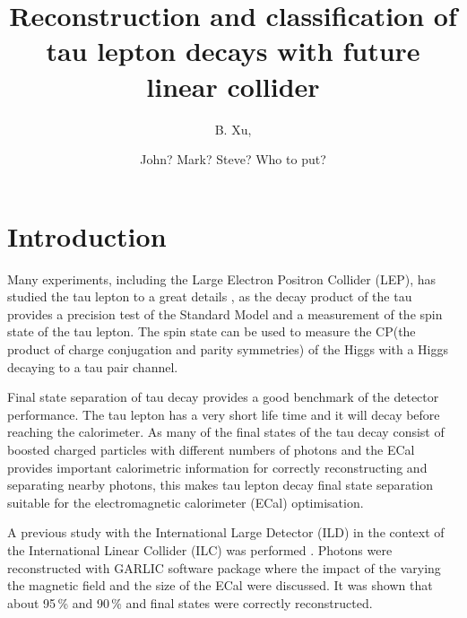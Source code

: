 \documentclass[a4paper,11pt]{article}
\title{\boldmath Reconstruction and classification of tau lepton decays with future \Pelectron\APelectron linear collider}
\author[a,1]{B. Xu,\note{Corresponding author.}}
\author[a]{John? Mark? Steve? Who to put?}
\affiliation[a]{Cavendish Laboratory,\\JJ Thomson Avenue, Cambridge, CB3 0HE, UK}
\begin{document}
\maketitle
\flushbottom


\section{Introduction}

Many experiments, including the Large Electron Positron Collider (LEP), has studied the tau lepton to a great details \cite{Schael:2005am}, as the decay product of the tau provides a precision test of the Standard Model and a measurement of the spin state of the tau lepton. The spin state can be used to measure the CP(the product of charge conjugation and parity symmetries) of the Higgs with a Higgs decaying to a tau pair channel.



Final state separation of tau decay provides a good benchmark of the detector performance. The tau lepton has a very short life time and it will decay before reaching the calorimeter. As many of the final states of the tau decay consist of boosted charged particles with different numbers of photons and the ECal provides important calorimetric information for correctly reconstructing and separating nearby photons, this makes tau lepton decay final state separation suitable for the electromagnetic calorimeter (ECal) optimisation.


A previous study with the International Large Detector (ILD) in the context of the International Linear Collider (ILC) was performed \cite{Tran2016}. Photons were reconstructed with GARLIC software package \cite{Reinhard2009,Jeans:2012jj} where the impact of the varying the magnetic field and the size of the ECal were discussed. It was shown that about 95\,\% \Ppiminus\Pnut and 90\,\% \Prhominus\Pnut and \Pai\Pnut final states were correctly reconstructed.
\end{document}
